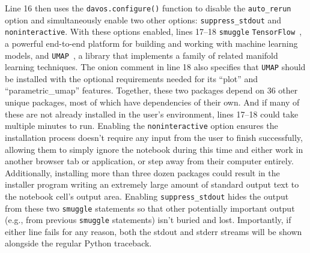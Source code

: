 \documentclass[preprint,12pt,a4paper]{elsarticle}
\begin{document}

Line 16 then uses the \texttt{davos.configure()} function to disable the \texttt{auto\_rerun} option and simultaneously enable two other options: \texttt{suppress\_stdout} and \texttt{noninteractive}. With these options enabled, lines 17--18 \texttt{smuggle} \texttt{TensorFlow}~\cite{AbadEtal15}, a powerful end-to-end platform for building and working with machine learning models, and \texttt{UMAP}~\cite{McInEtal18b}, a library that implements a family of related manifold learning techniques. The onion comment in line 18 also specifies that \texttt{UMAP} should be installed with the optional requirements needed for its ``plot'' and ``parametric\_umap'' features. Together, these two packages depend on 36 other unique packages, most of which have dependencies of their own. And if many of these are not already installed in the user's environment, lines 17--18 could take multiple minutes to run. Enabling the \texttt{noninteractive} option ensures the installation process doesn't require any input from the user to finish successfully, allowing them to simply ignore the notebook during this time and either work in another browser tab or application, or step away from their computer entirely. Additionally, installing more than three dozen packages could result in the installer program writing an extremely large amount of standard output text to the notebook cell's output area. Enabling \texttt{suppress\_stdout} hides the output from these two \texttt{smuggle} statements so that other potentially important output (e.g., from previous \texttt{smuggle} statements) isn't buried and lost. Importantly, if either line fails for any reason, both the stdout and stderr streams will be shown alongside the regular Python traceback. 

\end{document}
